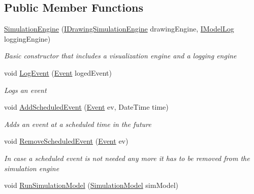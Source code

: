 \subsection*{Public Member Functions}
\begin{DoxyCompactItemize}
\item 
\hyperlink{class_simulation_core_1_1_simulation_classes_1_1_simulation_engine_a77f766c96d369f493f8902c5f317f6fc}{Simulation\+Engine} (\hyperlink{interface_simulation_core_1_1_interfaces_1_1_i_drawing_simulation_engine}{I\+Drawing\+Simulation\+Engine} drawing\+Engine, \hyperlink{interface_simulation_core_1_1_interfaces_1_1_i_model_log}{I\+Model\+Log} logging\+Engine)
\begin{DoxyCompactList}\small\item\em Basic constructor that includes a visualization engine and a logging engine \end{DoxyCompactList}\item 
void \hyperlink{class_simulation_core_1_1_simulation_classes_1_1_simulation_engine_af86e3344c1571c6f01cc12b5ab981dfe}{Log\+Event} (\hyperlink{class_simulation_core_1_1_h_c_c_m_elements_1_1_event}{Event} loged\+Event)
\begin{DoxyCompactList}\small\item\em Logs an event \end{DoxyCompactList}\item 
void \hyperlink{class_simulation_core_1_1_simulation_classes_1_1_simulation_engine_a9d51ec20bc58a94e99d856f41be8318d}{Add\+Scheduled\+Event} (\hyperlink{class_simulation_core_1_1_h_c_c_m_elements_1_1_event}{Event} ev, Date\+Time time)
\begin{DoxyCompactList}\small\item\em Adds an event at a scheduled time in the future \end{DoxyCompactList}\item 
void \hyperlink{class_simulation_core_1_1_simulation_classes_1_1_simulation_engine_ad509518ef4fc61aca187627ea2ce2b3f}{Remove\+Scheduled\+Event} (\hyperlink{class_simulation_core_1_1_h_c_c_m_elements_1_1_event}{Event} ev)
\begin{DoxyCompactList}\small\item\em In case a scheduled event is not needed any more it has to be removed from the simulation engine \end{DoxyCompactList}\item 
void \hyperlink{class_simulation_core_1_1_simulation_classes_1_1_simulation_engine_a7bee2b8df346d04f7d6001933dc4707f}{Run\+Simulation\+Model} (\hyperlink{class_simulation_core_1_1_simulation_classes_1_1_simulation_model}{Simulation\+Model} sim\+Model)

\end{DoxyCompactItemize}
